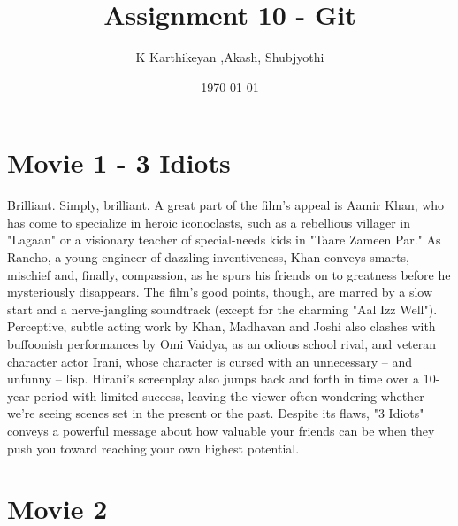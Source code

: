\documentclass[]{article}
\title{Assignment 10 - Git}
\author{K Karthikeyan ,Akash, Shubjyothi }
\date{\today}
\begin{document}
\maketitle

\section{Movie 1 - 3 Idiots}
Brilliant. Simply, brilliant. \newline
A great part of the film's appeal is Aamir Khan, who has come to specialize in heroic iconoclasts, such as a rebellious villager in "Lagaan" or a visionary teacher of special-needs kids in "Taare Zameen Par." As Rancho, a young engineer of dazzling inventiveness, Khan conveys smarts, mischief and, finally, compassion, as he spurs his friends on to greatness before he mysteriously disappears.\newline
The film's good points, though, are marred by a slow start and a nerve-jangling soundtrack (except for the charming "Aal Izz Well"). Perceptive, subtle acting work by Khan, Madhavan and Joshi also clashes with buffoonish performances by Omi Vaidya, as an odious school rival, and veteran character actor Irani, whose character is cursed with an unnecessary -- and unfunny -- lisp.\newline
Hirani's screenplay also jumps back and forth in time over a 10-year period with limited success, leaving the viewer often wondering whether we're seeing scenes set in the present or the past.\newline
Despite its flaws, "3 Idiots" conveys a powerful message about how valuable your friends can be when they push you toward reaching your own highest potential.\newline
\section{Movie 2}
\end{document}
